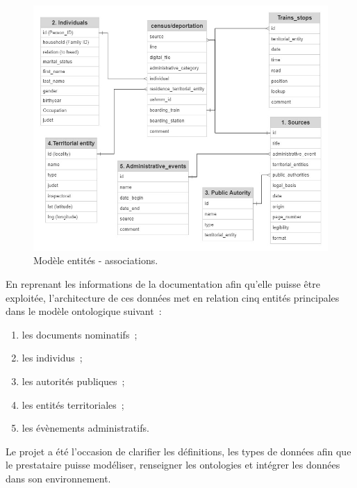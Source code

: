 \documentclass[a4paper,12pt,twoside]{book}
\begin{document}
			        \begin{figure}[!ht]
            			\centering
                        \includegraphics[width=\textwidth]{images/datamodel.jpg}
                        \vspace{-2em}
                        \caption{Modèle entités - associations.}
                        \label{fig17}
                    \end{figure}
                    \pagebreak
                    
                     En reprenant les informations de la documentation afin qu'elle puisse être exploitée, l’architecture de ces données met en relation cinq entités principales dans le modèle ontologique suivant~:
			        
			        \begin{enumerate}
			            \item les documents nominatifs~;
			            \item les individus~;
			            \item les autorités publiques~;
			            \item les entités territoriales~;
			            \item les évènements administratifs.
			        \end{enumerate}
                    
                    Le projet a été l'occasion de clarifier les définitions, les types de données afin que le prestataire puisse modéliser, renseigner les ontologies et intégrer les données dans son environnement.
\end{document}
